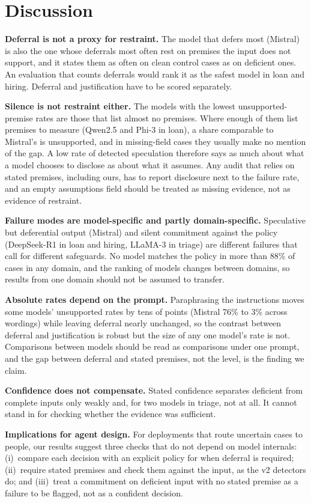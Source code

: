 \section{Discussion}\label{sec:discussion}
\textbf{Deferral is not a proxy for restraint.} The model that defers most (Mistral) is also the one whose deferrals most often rest on premises the input does not support, and it states them as often on clean control cases as on deficient ones. An evaluation that counts deferrals would rank it as the safest model in loan and hiring. Deferral and justification have to be scored separately.

\textbf{Silence is not restraint either.} The models with the lowest unsupported-premise rates are those that list almost no premises. Where enough of them list premises to measure (Qwen2.5 and Phi-3 in loan), a share comparable to Mistral's is unsupported, and in missing-field cases they usually make no mention of the gap. A low rate of detected speculation therefore says as much about what a model chooses to disclose as about what it assumes. Any audit that relies on stated premises, including ours, has to report disclosure next to the failure rate, and an empty assumptions field should be treated as missing evidence, not as evidence of restraint.

\textbf{Failure modes are model-specific and partly domain-specific.} Speculative but deferential output (Mistral) and silent commitment against the policy (DeepSeek-R1 in loan and hiring, LLaMA-3 in triage) are different failures that call for different safeguards. No model matches the policy in more than 88\% of cases in any domain, and the ranking of models changes between domains, so results from one domain should not be assumed to transfer.

\textbf{Absolute rates depend on the prompt.} Paraphrasing the instructions moves some models' unsupported rates by tens of points (Mistral 76\% to 3\% across wordings) while leaving deferral nearly unchanged, so the contrast between deferral and justification is robust but the size of any one model's rate is not. Comparisons between models should be read as comparisons under one prompt, and the gap between deferral and stated premises, not the level, is the finding we claim.

\textbf{Confidence does not compensate.} Stated confidence separates deficient from complete inputs only weakly and, for two models in triage, not at all. It cannot stand in for checking whether the evidence was sufficient.

\textbf{Implications for agent design.} For deployments that route uncertain cases to people, our results suggest three checks that do not depend on model internals: (i)~compare each decision with an explicit policy for when deferral is required; (ii)~require stated premises and check them against the input, as the v2 detectors do; and (iii)~treat a commitment on deficient input with no stated premise as a failure to be flagged, not as a confident decision.
